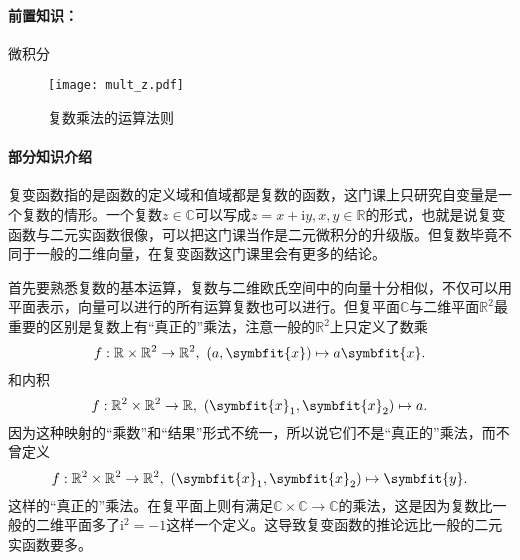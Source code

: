 \paragraph{前置知识：}微积分

\begin{wrapfigure}{r}{6cm}
    \texttt{[image: mult\_z.pdf]}
    \caption{复数乘法的运算法则}
\end{wrapfigure}

\paragraph{部分知识介绍}

复变函数指的是函数的定义域和值域都是复数的函数，这门课上只研究自变量是一个复数的情形。一个复数$z\in\mathbb{C}$可以写成$z=x+\mathrm{i}y, x,y\in\mathbb{R}$的形式，也就是说复变函数与二元实函数很像，可以把这门课当作是二元微积分的升级版。但复数毕竟不同于一般的二维向量，在复变函数这门课里会有更多的结论。

首先要熟悉复数的基本运算，复数与二维欧氏空间中的向量十分相似，不仅可以用平面表示，向量可以进行的所有运算复数也可以进行。但复平面$\mathbb{C}$与二维平面$\mathbb{R}^2$最重要的区别是复数上有“真正的”乘法，注意一般的$\mathbb{R}^2$上只定义了数乘
\[
    f:\mathbb{R} \times \mathbb{R}^2  \to \mathbb{R}^2,~ (a,\symbfit{x})  \mapsto a\symbfit{x}
    .\]
和内积
\[
    f:\mathbb{R}^2 \times \mathbb{R}^2\to \mathbb{R},~(\symbfit{x}_1,\symbfit{x}_2) \mapsto a
    .\]
因为这种映射的“乘数”和“结果”形式不统一，所以说它们不是“真正的”乘法，而不曾定义
\[
    f:\mathbb{R}^2 \times \mathbb{R}^2\to \mathbb{R}^2,~(\symbfit{x}_1,\symbfit{x}_2) \mapsto \symbfit{y}
    .\]
这样的“真正的”乘法。在复平面上则有满足$\mathbb{C} \times \mathbb{C} \to \mathbb{C}$的乘法，这是因为复数比一般的二维平面多了$\mathrm{i}^2=-1$这样一个定义。这导致复变函数的推论远比一般的二元实函数要多。

